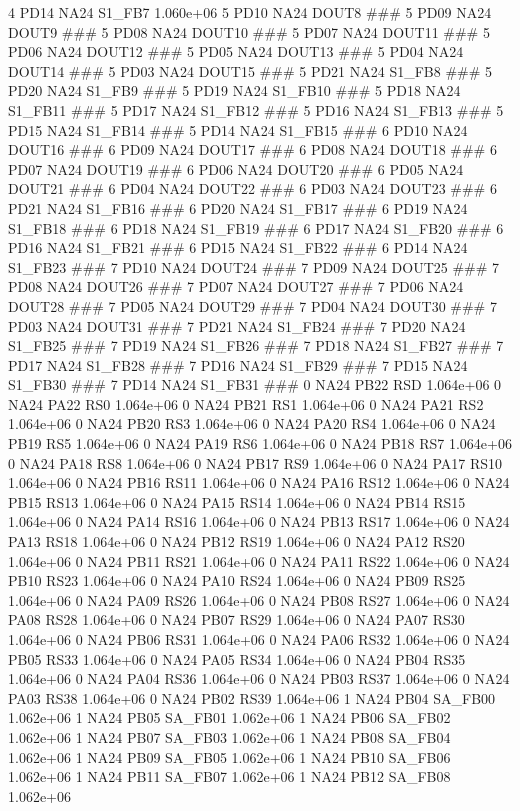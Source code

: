 4 PD14 NA24 S1_FB7 1.060e+06 
5 PD10 NA24 DOUT8 ### 
5 PD09 NA24 DOUT9 ### 
5 PD08 NA24 DOUT10 ### 
5 PD07 NA24 DOUT11 ### 
5 PD06 NA24 DOUT12 ### 
5 PD05 NA24 DOUT13 ### 
5 PD04 NA24 DOUT14 ### 
5 PD03 NA24 DOUT15 ### 
5 PD21 NA24 S1_FB8 ### 
5 PD20 NA24 S1_FB9 ### 
5 PD19 NA24 S1_FB10 ### 
5 PD18 NA24 S1_FB11 ### 
5 PD17 NA24 S1_FB12 ### 
5 PD16 NA24 S1_FB13 ### 
5 PD15 NA24 S1_FB14 ### 
5 PD14 NA24 S1_FB15 ### 
6 PD10 NA24 DOUT16 ### 
6 PD09 NA24 DOUT17 ### 
6 PD08 NA24 DOUT18 ### 
6 PD07 NA24 DOUT19 ### 
6 PD06 NA24 DOUT20 ### 
6 PD05 NA24 DOUT21 ### 
6 PD04 NA24 DOUT22 ### 
6 PD03 NA24 DOUT23 ### 
6 PD21 NA24 S1_FB16 ### 
6 PD20 NA24 S1_FB17 ### 
6 PD19 NA24 S1_FB18 ### 
6 PD18 NA24 S1_FB19 ### 
6 PD17 NA24 S1_FB20 ### 
6 PD16 NA24 S1_FB21 ### 
6 PD15 NA24 S1_FB22 ### 
6 PD14 NA24 S1_FB23 ### 
7 PD10 NA24 DOUT24 ### 
7 PD09 NA24 DOUT25 ### 
7 PD08 NA24 DOUT26 ### 
7 PD07 NA24 DOUT27 ### 
7 PD06 NA24 DOUT28 ### 
7 PD05 NA24 DOUT29 ### 
7 PD04 NA24 DOUT30 ### 
7 PD03 NA24 DOUT31 ### 
7 PD21 NA24 S1_FB24 ### 
7 PD20 NA24 S1_FB25 ### 
7 PD19 NA24 S1_FB26 ### 
7 PD18 NA24 S1_FB27 ### 
7 PD17 NA24 S1_FB28 ### 
7 PD16 NA24 S1_FB29 ### 
7 PD15 NA24 S1_FB30 ### 
7 PD14 NA24 S1_FB31 ### 
0 NA24 PB22 RSD 1.064e+06 
0 NA24 PA22 RS0 1.064e+06 
0 NA24 PB21 RS1 1.064e+06 
0 NA24 PA21 RS2 1.064e+06 
0 NA24 PB20 RS3 1.064e+06 
0 NA24 PA20 RS4 1.064e+06 
0 NA24 PB19 RS5 1.064e+06 
0 NA24 PA19 RS6 1.064e+06 
0 NA24 PB18 RS7 1.064e+06 
0 NA24 PA18 RS8 1.064e+06 
0 NA24 PB17 RS9 1.064e+06 
0 NA24 PA17 RS10 1.064e+06 
0 NA24 PB16 RS11 1.064e+06 
0 NA24 PA16 RS12 1.064e+06 
0 NA24 PB15 RS13 1.064e+06 
0 NA24 PA15 RS14 1.064e+06 
0 NA24 PB14 RS15 1.064e+06 
0 NA24 PA14 RS16 1.064e+06 
0 NA24 PB13 RS17 1.064e+06 
0 NA24 PA13 RS18 1.064e+06 
0 NA24 PB12 RS19 1.064e+06 
0 NA24 PA12 RS20 1.064e+06 
0 NA24 PB11 RS21 1.064e+06 
0 NA24 PA11 RS22 1.064e+06 
0 NA24 PB10 RS23 1.064e+06 
0 NA24 PA10 RS24 1.064e+06 
0 NA24 PB09 RS25 1.064e+06 
0 NA24 PA09 RS26 1.064e+06 
0 NA24 PB08 RS27 1.064e+06 
0 NA24 PA08 RS28 1.064e+06 
0 NA24 PB07 RS29 1.064e+06 
0 NA24 PA07 RS30 1.064e+06 
0 NA24 PB06 RS31 1.064e+06 
0 NA24 PA06 RS32 1.064e+06 
0 NA24 PB05 RS33 1.064e+06 
0 NA24 PA05 RS34 1.064e+06 
0 NA24 PB04 RS35 1.064e+06 
0 NA24 PA04 RS36 1.064e+06 
0 NA24 PB03 RS37 1.064e+06 
0 NA24 PA03 RS38 1.064e+06 
0 NA24 PB02 RS39 1.064e+06 
1 NA24 PB04 SA_FB00 1.062e+06 
1 NA24 PB05 SA_FB01 1.062e+06 
1 NA24 PB06 SA_FB02 1.062e+06 
1 NA24 PB07 SA_FB03 1.062e+06 
1 NA24 PB08 SA_FB04 1.062e+06 
1 NA24 PB09 SA_FB05 1.062e+06 
1 NA24 PB10 SA_FB06 1.062e+06 
1 NA24 PB11 SA_FB07 1.062e+06 
1 NA24 PB12 SA_FB08 1.062e+06 
